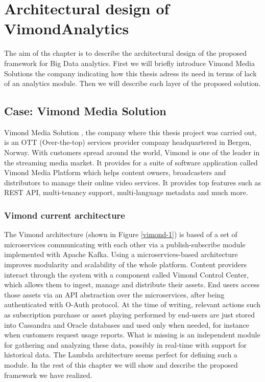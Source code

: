 \chapter{Architectural design of VimondAnalytics}
\label{chap:chapter3}
The aim of ths chapter is to describe the architectural design of the proposed framework for Big Data analytics. First we will briefly introduce Vimond Media Solutions the company indicating how this thesis adress its need in terms of lack of an analytics module. Then we will describe each layer of the proposed solution.

\section{Case: Vimond Media Solution}
Vimond Media Solution \cite{bib1}, the company where this thesis project was carried out,  is an OTT (Over-the-top) services provider company headquartered in Bergen, Norway. With customers spread around the world, Vimond is one of the leader in the streaming media market. It provides for a suite of software application called Vimond Media Platform which helps content owners, broadcasters and distributors to manage their online video services. It provides top features such as REST API, multi-tenancy support, multi-language metadata and much more.

\subsection{Vimond current architecture}
The Vimond architecture (shown in Figure \ref{vimond-1}) is based of a set of microservices communicating with each other via a publish-subscribe module implemented with Apache Kafka. Using a microservices-based architecture improves modularity and scalability of the whole platform. Content providers interact through the system with a component called Vimond Control Center, which allows them to ingest, manage and distribute their assets. End users access those assets via an API abstraction over the microservices, after being authenticated with O-Auth protocol. At the time of writing, relevant actions such as subscription purchase or asset playing performed by end-users are just stored into Cassandra and Oracle databases and used only when needed, for instance when customers request usage reports. What is missing is an independent module for gathering and analyzing these data, possibly in real-time with support for historical data. The Lambda architecture seems perfect for defining such a module. In the rest of this chapter we will show and describe the proposed framework we have realized.

